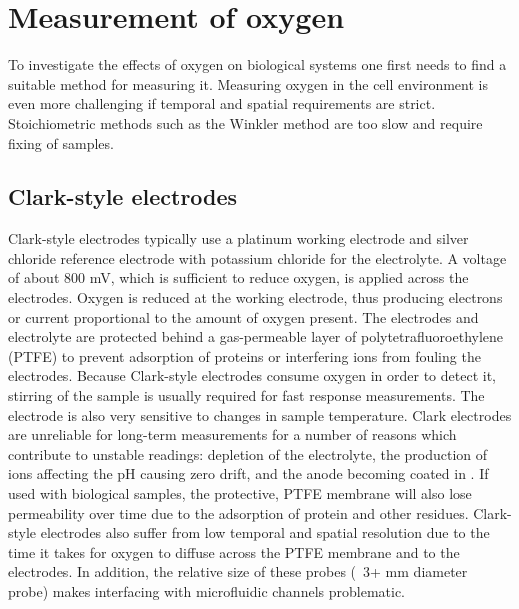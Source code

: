 
\section{Measurement of oxygen}

To investigate the effects of oxygen on biological systems one first needs to find a suitable method for measuring it. Measuring oxygen in the cell environment is even more challenging if temporal and spatial requirements are strict. Stoichiometric methods such as the Winkler method \cite{winkler1888} are too slow and require fixing of samples.

\subsection{Clark-style electrodes}

Clark-style electrodes \cite{Clark1953} typically use a platinum working electrode and silver chloride reference electrode with potassium chloride for the electrolyte.
A voltage of about 800 mV, which is sufficient to reduce oxygen, is applied across the electrodes.
Oxygen is reduced at the working electrode, thus producing electrons or current proportional to the amount of oxygen present.
The electrodes and electrolyte are protected behind a gas-permeable layer of polytetrafluoroethylene (PTFE) to prevent adsorption of proteins or interfering ions from fouling the electrodes.
Because Clark-style electrodes consume oxygen in order to detect it, stirring of the sample is usually required for fast response measurements.
The electrode is also very sensitive to changes in sample temperature.
Clark electrodes are unreliable for long-term measurements for a number of reasons which contribute to unstable readings: depletion of the electrolyte, the production of  ions affecting the pH causing zero drift, and the anode becoming coated in .
If used with biological samples, the protective, PTFE membrane will also lose permeability over time due to the adsorption of protein and other residues.
Clark-style electrodes also suffer from low temporal and spatial resolution due to the time it takes for oxygen to diffuse across the PTFE membrane and to the electrodes.
In addition, the relative size of these probes (~3+ mm diameter probe) makes interfacing with microfluidic channels problematic.

